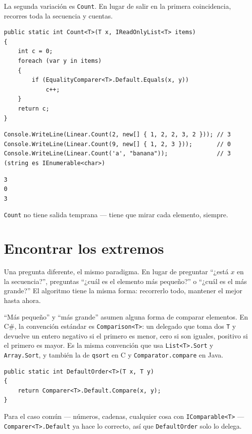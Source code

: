 \documentclass[11pt,a4paper]{article}
\begin{document}
La segunda variación es \texttt{Count}. En lugar de salir en la primera coincidencia, recorres toda la secuencia y cuentas.

\begin{lstlisting}[caption={\texttt{Count}: sin salida temprana}]
public static int Count<T>(T x, IReadOnlyList<T> items)
{
    int c = 0;
    foreach (var y in items)
    {
        if (EqualityComparer<T>.Default.Equals(x, y))
            c++;
    }
    return c;
}
\end{lstlisting}

\begin{lstlisting}
Console.WriteLine(Linear.Count(2, new[] { 1, 2, 2, 3, 2 })); // 3
Console.WriteLine(Linear.Count(9, new[] { 1, 2, 3 }));       // 0
Console.WriteLine(Linear.Count('a', "banana"));              // 3 (string es IEnumerable<char>)
\end{lstlisting}

\begin{verbatim}
3
0
3
\end{verbatim}

\texttt{Count} no tiene salida temprana --- tiene que mirar cada elemento, siempre.

\section{Encontrar los extremos}

Una pregunta diferente, el mismo paradigma. En lugar de preguntar ``¿está $x$ en la secuencia?'', preguntas ``¿cuál es el elemento más pequeño?'' o ``¿cuál es el más grande?'' El algoritmo tiene la misma forma: recorrerlo todo, mantener el mejor hasta ahora.

``Más pequeño'' y ``más grande'' asumen alguna forma de comparar elementos. En C\#, la convención estándar es \texttt{Comparison<T>}: un delegado que toma dos \texttt{T} y devuelve un entero negativo si el primero es menor, cero si son iguales, positivo si el primero es mayor. Es la misma convención que usa \texttt{List<T>.Sort} y \texttt{Array.Sort}, y también la de \texttt{qsort} en C y \texttt{Comparator.compare} en Java.

\begin{lstlisting}[caption={Orden por defecto}]
public static int DefaultOrder<T>(T x, T y)
{
    return Comparer<T>.Default.Compare(x, y);
}
\end{lstlisting}

Para el caso común --- números, cadenas, cualquier cosa con \texttt{IComparable<T>} --- \texttt{Comparer<T>.Default} ya hace lo correcto, así que \texttt{DefaultOrder} solo lo delega.
\end{document}
